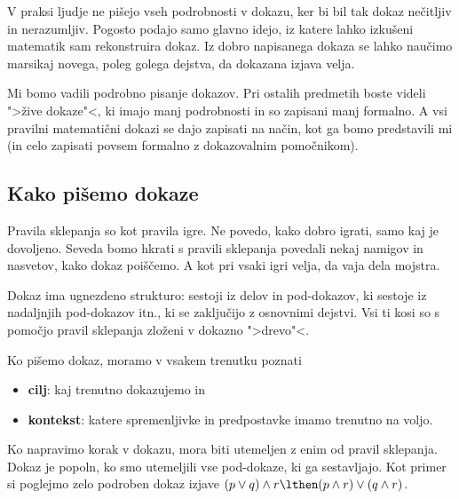 V praksi ljudje ne pišejo vseh podrobnosti v dokazu, ker bi bil tak dokaz nečitljiv in nerazumljiv. Pogosto podajo samo glavno idejo, iz katere lahko izkušeni matematik sam rekonstruira dokaz. Iz dobro napisanega dokaza se lahko naučimo marsikaj novega, poleg golega dejstva, da dokazana izjava velja.

Mi bomo vadili podrobno pisanje dokazov. Pri ostalih predmetih boste videli ">žive dokaze"<, ki imajo manj podrobnosti in so zapisani manj formalno. A vsi pravilni matematični dokazi se dajo zapisati na način, kot ga bomo predstavili mi (in celo zapisati povsem formalno z dokazovalnim pomočnikom).

\subsection{Kako pišemo dokaze}

Pravila sklepanja so kot pravila igre. Ne povedo, kako dobro igrati, samo kaj je dovoljeno. Seveda bomo hkrati s pravili sklepanja povedali nekaj namigov in nasvetov, kako dokaz poiščemo. A kot pri vsaki igri velja, da vaja dela mojstra.

Dokaz ima ugnezdeno strukturo: sestoji iz delov in pod-dokazov, ki sestoje iz nadaljnjih pod-dokazov itn., ki se zaključijo z osnovnimi dejstvi. Vsi ti kosi so s pomočjo pravil sklepanja zloženi v dokazno ">drevo"<.

Ko pišemo dokaz, moramo v vsakem trenutku poznati
%
\begin{itemize}
\item \textbf{cilj}: kaj trenutno dokazujemo in
\item \textbf{kontekst}: katere spremenljivke in predpostavke imamo trenutno na voljo.
\end{itemize}
%
Ko napravimo korak v dokazu, mora biti utemeljen z enim od pravil sklepanja. Dokaz je
popoln, ko smo utemeljili vse pod-dokaze, ki ga sestavljajo. Kot primer si poglejmo zelo podroben dokaz izjave
%
$(p \lor q) \land r \lthen (p \land r) \lor (q \land r)$.

